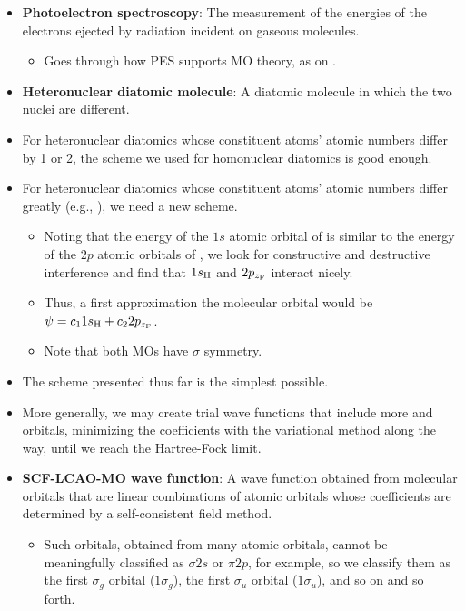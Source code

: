 \documentclass[../notes.tex]{subfiles}
\begin{document}
\begin{itemize}
    \item \textbf{Photoelectron spectroscopy}: The measurement of the energies of the electrons ejected by radiation incident on gaseous molecules.
    \begin{itemize}
        \item Goes through how PES supports MO theory, as on \textcite[56]{bib:IChemNotes}.
    \end{itemize}
    \item \textbf{Heteronuclear diatomic molecule}: A diatomic molecule in which the two nuclei are different.
    \item For heteronuclear diatomics whose constituent atoms' atomic numbers differ by 1 or 2, the scheme we used for homonuclear diatomics is good enough.
    \item For heteronuclear diatomics whose constituent atoms' atomic numbers differ greatly (e.g., ), we need a new scheme.
    \begin{itemize}
        \item Noting that the energy of the $1s$ atomic orbital of  is similar to the energy of the $2p$ atomic orbitals of , we look for constructive and destructive interference and find that $1s_{\ce{H}}$ and $2p_{z_{\ce{F}}}$ interact nicely.
        \item Thus, a first approximation the molecular orbital would be $\psi=c_11s_{\ce{H}}+c_22p_{z_{\ce{F}}}$.
        \item Note that both MOs have $\sigma$ symmetry.
    \end{itemize}
    \item The scheme presented thus far is the simplest possible.
    \item More generally, we may create trial wave functions that include more and orbitals, minimizing the coefficients with the variational method along the way, until we reach the Hartree-Fock limit.
    \item \textbf{SCF-LCAO-MO wave function}: A wave function obtained from molecular orbitals that are linear combinations of atomic orbitals whose coefficients are determined by a self-consistent field method.
    \begin{itemize}
        \item Such orbitals, obtained from many atomic orbitals, cannot be meaningfully classified as $\sigma 2s$ or $\pi 2p$, for example, so we classify them as the first $\sigma_g$ orbital ($1\sigma_g$), the first $\sigma_u$ orbital ($1\sigma_u$), and so on and so forth.

\end{itemize}
\end{itemize}
\end{document}
